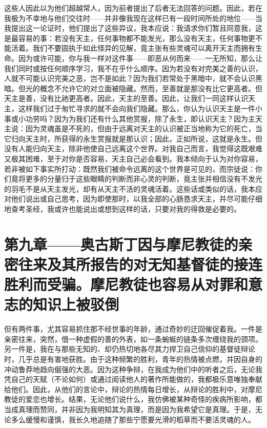 这些人因此以为他们超越常人，因为前者提出了后者无法回答的问题。因此，若在我极为不幸地与他们交往时——并非像我现在这样已有一段时间所处的地位——当我提出这一论证时，他们提出了这些异议，我本应说：我请求你们暂且同意我，这是最容易的事：若没有天主，任何事物都不能发光，那么没有天主，任何事物更不能活着。我们不要固执于如此怪异的见解，竟主张有些灵魂可以离开天主而拥有生命。因为或许可能，你与我一样对这件事——即恶从何而来——一无所知，那么让我们同时或按任何顺序学习，我不在乎什么顺序。因为若没有对完美之善的认识，人就不可能认识完美之恶，岂不是如此？因为我们若常处于黑暗中，就不会认识黑暗。但光的概念不允许它的对立面被隐藏。然而，至善就是那没有比它更高者。但天主是善，没有比祂更高者。因此，天主的至善。因此，让我们一同这样认识天主，这样我们过于匆忙寻求的就不会向我们隐藏。那么，你认为认识天主是一件小事或小功劳吗？因为为我们还有什么其他赏报，除了永生，即认识天主？因为主天主说：因为灵魂虽是不死的，但由于远离对天主的认识被正当地称为它的死亡，当它归向天主时，所获得的永生赏报就是那认识；因此，正如所说，这就是永生。但没有人能归向天主，除非他使自己远离这个世界。对我自己而言，我觉得这既艰难又极其困难，至于对你是否容易，天主自己必会看到。我本倾向于认为对你容易，若非被如下事实所打动：既然我们被命令远离的这个世界是可见的，而宗徒说：你们竟将更多的分量归于这些眼睛的判断而非心灵的判断，竟主张并相信没有不发光的羽毛不是从天主发光，却有从天主不活的灵魂活着。这些话或类似的话，我本应对他们说出或自己思考，因为即使那时，以我全部的心肠恳求天主，并尽可能仔细地查考圣经，我或许也能说出或想到这样的话，只要对我的得救是必要的。\par


\section{第九章——奥古斯丁因与摩尼教徒的亲密往来及其所报告的对无知基督徒的接连胜利而受骗。摩尼教徒也容易从对罪和意志的知识上被驳倒}

但有两件事，尤其容易抓住那不经世事的年龄，通过奇妙的迂回催促着我。一件是亲密往来，突然，借一种虚假的善的外表，如一条蜿蜒的链条多次缠绕我的颈项。另一件是，我在与那些无知的、却仍热切地各尽其力捍卫自己信仰的基督徒辩论时，几乎总是有害地获胜。由于这种频繁的胜利，青年的热情被点燃，并因自身的冲动鲁莽地趋向倔强的大恶。因为这种争辩，在我成为他们中的听者之后，无论我凭自己的天赋（不论如何）或通过阅读他人的著作所能做的，我都极乐意唯独奉献给他们。因此，从他们的言论中，辩论的热情每日增长，从辩论的胜利中，对摩尼教徒的爱恋也增长。结果，无论他们说什么，我仿佛被某种奇怪的疾病所影响，都当成真理而赞同，并非因为我明知其为真理，而是因为我希望它是真理。于是，无论多么缓慢和谨慎，我长久地追随了那些宁愿要光滑的稻草而不要活灵魂的人。\par


